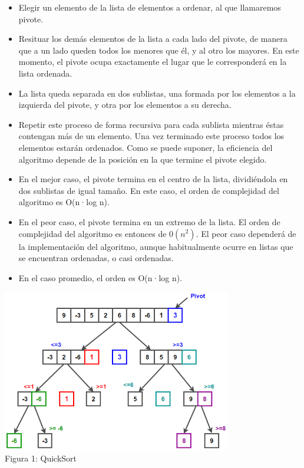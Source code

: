 \documentclass[spanish]{article}
\begin{document}
	\begin{itemize}
		\item Elegir un elemento de la lista de elementos a ordenar, al que llamaremos pivote.
		\item Resituar los demás elementos de la lista a cada lado del pivote, de manera que a un lado queden todos los menores que él, y al otro los mayores. En este momento, el pivote 				ocupa exactamente el lugar que le corresponderá en la lista ordenada.
		\item La lista queda separada en dos sublistas, una formada por los elementos a la izquierda del pivote, y otra por los elementos a su derecha.
		\item Repetir este proceso de forma recursiva para cada sublista mientras éstas contengan más de un elemento. Una vez terminado este proceso todos los elementos estarán 				ordenados. Como se puede suponer, la eficiencia del algoritmo depende de la posición en la que termine el pivote elegido.
		\item En el mejor caso, el pivote termina en el centro de la lista, dividiéndola en dos sublistas de igual tamaño. En este caso, el orden de complejidad del algoritmo es O(n·log n).
		\item En el peor caso, el pivote termina en un extremo de la lista. El orden de complejidad del algoritmo es entonces de $0(n^{2})$. El peor caso dependerá de la implementación del algoritmo, aunque habitualmente ocurre en listas que se encuentran ordenadas, o casi ordenadas.
		\item En el caso promedio, el orden es O(n·log n).
	\end{itemize}

	\bigskip
	\begin{center}
		\includegraphics[width=100mm]{./imagenes/Quicksort.png}\\
		Figura 1: QuickSort
	\end{center}
\end{document}
